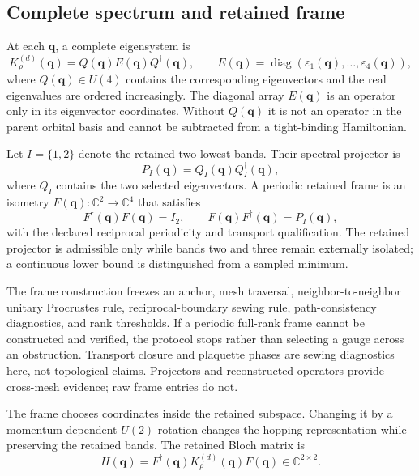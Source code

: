 \documentclass[11pt]{article}
\newcommand{\C}{\mathbb C}
\begin{document}
\subsection{Complete spectrum and retained frame}

At each $\mathbf q$, a complete eigensystem is
\begin{equation}
 K_\rho^{(d)}(\mathbf q)
 =Q(\mathbf q)E(\mathbf q)Q^\dagger(\mathbf q),
 \qquad
 E(\mathbf q)=\operatorname{diag}
 (\varepsilon_1(\mathbf q),\ldots,\varepsilon_4(\mathbf q)),
 \label{eq:eigensystem}
\end{equation}
where $Q(\mathbf q)\in U(4)$ contains the corresponding eigenvectors and the real
eigenvalues are ordered increasingly. The diagonal array $E(\mathbf q)$ is an operator
only in its eigenvector coordinates. Without $Q(\mathbf q)$ it is not an operator in the
parent orbital basis and cannot be subtracted from a tight-binding Hamiltonian.

Let $I=\{1,2\}$ denote the retained two lowest bands. Their spectral projector is
\begin{equation}
 P_I(\mathbf q)=Q_I(\mathbf q)Q_I^\dagger(\mathbf q),
 \label{eq:retained-projector}
\end{equation}
where $Q_I$ contains the two selected eigenvectors. A periodic retained frame is an
isometry $F(\mathbf q):\C^2\to\C^4$ that satisfies
\begin{equation}
 F^\dagger(\mathbf q)F(\mathbf q)=I_2,
 \qquad
 F(\mathbf q)F^\dagger(\mathbf q)=P_I(\mathbf q),
 \label{eq:frame-definition}
\end{equation}
with the declared reciprocal periodicity and transport qualification. The retained
projector is admissible only while bands two and three remain externally isolated; a
continuous lower bound is distinguished from a sampled minimum.

The frame construction freezes an anchor, mesh traversal, neighbor-to-neighbor unitary
Procrustes rule, reciprocal-boundary sewing rule, path-consistency diagnostics, and rank
thresholds. If a periodic full-rank frame cannot be constructed and verified, the
protocol stops rather than selecting a gauge across an obstruction. Transport closure
and plaquette phases are sewing diagnostics here, not topological claims. Projectors and
reconstructed operators provide cross-mesh evidence; raw frame entries do not.

The frame chooses coordinates inside the retained subspace. Changing it by a
momentum-dependent $U(2)$ rotation changes the hopping representation while preserving
the retained bands. The retained Bloch matrix is
\begin{equation}
 H(\mathbf q)=F^\dagger(\mathbf q)
 K_\rho^{(d)}(\mathbf q)F(\mathbf q)\in\C^{2\times2}.
 \label{eq:retained}
\end{equation}
\end{document}
